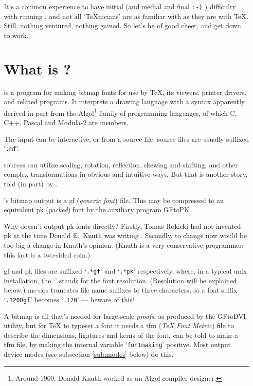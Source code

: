 It's a common experience to have initial (and medial and final
{\tt :-)} ) difficulty with running \MF{}, and not all `\TeX{}nicians'
are as familiar with \MF{} as they are with \TeX{}.  Still, nothing
ventured, nothing gained.  So let's be of good cheer, and get down to
work.


\section{What is \MF{}?}

\MF{} is a program for making bitmap fonts for use by \TeX{},
its viewers, printer drivers, and related programs.
It interprets a drawing language
with a syntax apparently derived in part from the Algol\footnote
{Around 1960, Donald {\sc Knuth} worked as an Algol compiler
designer.}
family of programming languages, of which C, C++, Pascal and Modula-2
are members.

The input can be interactive, or from a source file.
\MF{} source files are usually suffixed `{\tt .mf}'.

\MF{} sources can utilize scaling, rotation, reflection, skewing and shifting,
and other complex transformations in obvious and intuitive ways.
But that is another story, told (in part) by \MFbook{}.

\MF{}'s bitmap output is a {\sc gf} ({\em generic font\/}) file.
This may be compressed to an equivalent {\sc pk} ({\em packed\/}) font
by the auxiliary program {\sf GFtoPK}.

Why doesn't \MF{} output {\sc pk} fonts directly?  Firstly, Tomas
{\sc Rokicki} had not invented {\sc pk} at the time Donald
E.~{\sc Knuth} was writing \MF{}.  Secondly, to change \MF{} now
would be too big a change in {\sc Knuth}'s opinion.  ({\sc Knuth}
is a very conservative programmer; this fact is a two-sided coin.)

{\sc gf} and {\sc pk} files are suffixed `{\tt .*gf}' and `{\tt .*pk}'
respectively, where, in a typical {\sc unix} installation, the
`{\tt *}' stands for the font resolution.
(Resolution will be explained below.)
{\sc ms-dos} truncates file name suffixes to three characters, so a
font suffix `{\tt .1200gf}' becomes `{\tt .120}' --- beware of this!

A bitmap is all that's needed for large-scale {\em proofs},
as produced by the {\sf GFtoDVI} utility,
but for \TeX{} to typeset a font it needs a {\sc tfm}
({\em \TeX{} Font Metric\/}) file to describe the dimensions, ligatures
and kerns of the font.  \MF{} can be told to make a {\sc tfm} file,
by making the internal variable `{\tt fontmaking}' positive.  Most
output device modes (see subsection \ref{sub:modes} below) do this.

